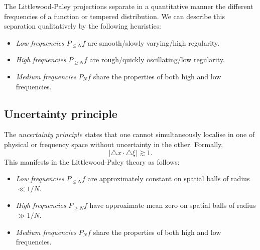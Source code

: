 The Littlewood-Paley projections separate in a quantitative manner the different frequencies of a function or tempered distribution. We can describe this separation qualitatively by the following heuristics:
\begin{itemize}
	\item \textit{Low frequencies} $P_{\leq N} f$ are smooth/slowly varying/high regularity.
	
	\item \textit{High frequencies} $P_{\geq N} f$ are rough/quickly oscillating/low regularity.
	
	\item \textit{Medium frequencies} $P_N f$ share the properties of both high and low frequencies. 
\end{itemize}

\subsection{Uncertainty principle}

The \textit{uncertainty principle} states that one cannot simultaneously localise in one of physical or frequency space without uncertainty in the other. Formally, 
	\[ |\triangle x \cdot \triangle \xi| \gtrsim 1.\]
This manifests in the Littlewood-Paley theory as follows:	
\begin{itemize}
	\item \textit{Low frequencies} $P_{\leq N} f$ 
are approximately constant on spatial balls of radius $\ll 1/N$. 
	
	\item \textit{High frequencies} $P_{\geq N} f$ have approximate mean zero on spatial balls of radius $\gg 1/N$. 
	
	\item \textit{Medium frequencies} $P_N f$ share the properties of both high and low frequencies. 
\end{itemize}


